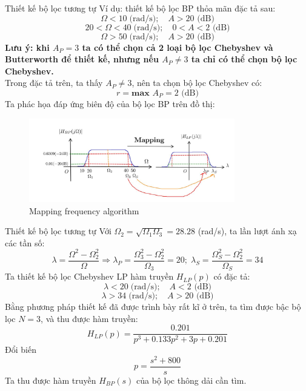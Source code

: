 \documentclass[8pt]{beamer}
\begin{document}
\begin{frame}{Thiết kế bộ lọc tương tự}
Ví dụ: thiết kế bộ lọc BP thỏa mãn đặc tả sau:
$$\Omega<10\;\text{(rad/s)};\quad A>20\text{ (dB)}$$
$$20<\Omega<40\;\text{(rad/s)};\quad 0<A<2\text{ (dB)}$$
$$\Omega>50\;\text{(rad/s)};\quad A>20\text{ (dB)}$$
\textbf{Lưu ý: khi $A_{P}=3$ ta có thể chọn cả 2 loại bộ lọc Chebyshev và Butterworth để thiết kế, nhưng nếu $A_{P}\neq3$ ta chỉ có thể chọn bộ lọc Chebyshev.}
\\Trong đặc tả trên, ta thấy $A_{P}\neq3$, nên ta chọn bộ lọc Chebyshev có: $$r=\textbf{max }A_{P}=2\text{ (dB)}$$
Ta phác họa đáp ứng biên độ của bộ lọc BP trên đồ thị:
\begin{figure}[h]
	\includegraphics[width=0.8\textwidth]{19.jpg}
	\caption{Mapping frequency algorithm}			\label{fig:re2}
		\end{figure}

\end{frame}
\begin{frame}{Thiết kế bộ lọc tương tự}
Với $\Omega_{2}=\sqrt{\Omega_{1}\Omega_{3}}=28.28$ (rad/s),
ta lần lượt ánh xạ các tần số: $$\lambda=\frac{\Omega^2-\Omega_{2}^2}{\Omega}\Rightarrow \lambda_{P}=\frac{\Omega_{3}^2-\Omega_{2}^2}{\Omega_{3}}=20;\;\lambda_{S}=\frac{\Omega_{S}^2-\Omega_{2}^2}{\Omega_{S}}=34$$
 Ta thiết kế bộ lọc Chebyshev LP hàm truyền $H_{LP}(p)$ có đặc tả:
$$\lambda<20\;\text{(rad/s)};\quad A<2\text{ (dB)}$$
$$\lambda>34\;\text{(rad/s)};\quad A>20\text{ (dB)}$$
Bằng phương pháp thiết kế đã được trình bày rất kĩ ở trên, ta tìm được bậc bộ lọc $N=3$, và thu được hàm truyền:
$$H_{LP}(p)=\frac{0.201}{p^3+0.133p^2+3p+0.201}$$
Đổi biến $$p=\frac{s^2+800}{s}$$
Ta thu được hàm truyền $H_{BP}(s)$ của bộ lọc thông dải cần tìm.
\end{frame}
\end{document}
